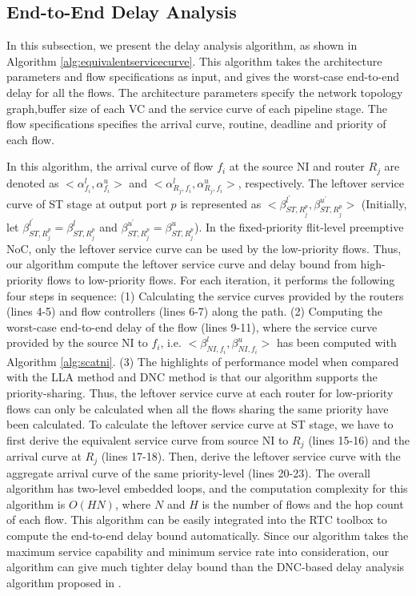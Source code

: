 \documentclass[10pt,journal]{IEEEtran}
\begin{document}
\subsection{End-to-End Delay Analysis}\label{e2elatency}
In this subsection, we present the delay analysis algorithm, as shown in Algorithm \ref{alg:equivalentservicecurve}. This algorithm takes the architecture parameters and flow specifications as input, and gives the worst-case end-to-end delay for all the flows. The architecture parameters specify the network topology graph,buffer size of each VC and the service curve of each pipeline stage. The flow specifications specifies the arrival curve, routine, deadline and priority of each flow.

In this algorithm, the arrival curve of flow $f_i$ at the source NI and router $R_j$ are denoted as $<\alpha_{f_i}^l,\alpha_{f_i}^u>$ and $<\alpha_{R_j,f_i}^l,\alpha_{R_j,f_i}^u>$, respectively. The leftover service curve of ST stage at output port $p$ is represented as $<\beta_{ST,R_j^{p}}^{l^\prime},\beta_{ST,R_j^{p}}^{u^\prime}>$ (Initially, let $\beta_{ST,R_j^{p}}^{l^\prime}=\beta_{ST,R_j^{p}}^{l}$ and $\beta_{ST,R_j^{p}}^{u^\prime}=\beta_{ST,R_j^{p}}^{u}$). In the fixed-priority flit-level preemptive NoC, only the leftover service curve can be used by the low-priority flows. Thus, our algorithm compute the leftover service curve and delay bound from high-priority flows to low-priority flows. For each iteration, it performs the following four steps in sequence: (1) Calculating the service curves provided by the routers (lines 4-5) and flow controllers (lines 6-7) along the path. (2) Computing the worst-case end-to-end delay of the flow (lines 9-11), where the service curve provided by the source NI to $f_i$, i.e. $<\beta_{NI,f_i}^l,\beta_{NI,f_i}^u>$ has been computed with Algorithm \ref{alg:scatni}. (3) The highlights of performance model when compared with the LLA method \cite{73} and DNC method \cite{Qian489900} is that our algorithm supports the priority-sharing. Thus, the leftover service curve at each router for low-priority flows can only be calculated when all the flows sharing the same priority have been calculated. To calculate the leftover service curve at ST stage, we have to first derive the equivalent service curve from source NI to $R_j$ (lines 15-16) and the arrival curve at $R_j$ (lines 17-18). Then, derive the leftover service curve with the aggregate arrival curve of the same priority-level (lines 20-23). The overall algorithm has two-level embedded loops, and the computation complexity for this algorithm is $O(HN)$, where $N$ and $H$ is the number of flows and the hop count of each flow. This algorithm can be easily integrated into the RTC toolbox \cite{rtc} to compute the end-to-end delay bound automatically. Since our algorithm takes the maximum service capability and minimum service rate into consideration, our algorithm can give much tighter delay bound than the DNC-based delay analysis algorithm proposed in \cite{Qian489900}.
\end{document}
